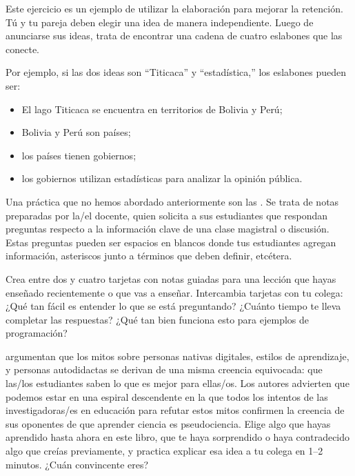 
Este ejercicio es un ejemplo de utilizar la elaboración para mejorar la retención.
Tú y tu pareja deben elegir una idea de manera independiente.
Luego de anunciarse sus ideas,
trata de encontrar una cadena de cuatro eslabones
que las conecte.

Por ejemplo,
si las dos ideas son ``Titicaca'' y ``estadística,''
los eslabones pueden ser:

\begin{itemize}

\item
  El lago Titicaca se encuentra en territorios de Bolivia y Perú;

\item
  Bolivia y Perú son países;

\item
 los países tienen gobiernos;

\item
  los gobiernos utilizan estadísticas para analizar la opinión pública.

\end{itemize}


Una práctica que no hemos abordado anteriormente son las .
Se trata de notas preparadas por la/el docente,
quien solicita a sus estudiantes que respondan preguntas respecto a la información clave de una clase magistral o discusión.
Estas preguntas pueden ser espacios en blancos donde tus estudiantes agregan información,
asteriscos junto a términos que deben definir,
etcétera.

Crea entre dos y cuatro tarjetas con notas guiadas para una lección que hayas enseñado recientemente
o que vas a enseñar.
Intercambia tarjetas con tu colega:
¿Qué tan fácil es entender lo que se está preguntando?
¿Cuánto tiempo te lleva completar las respuestas?
¿Qué tan bien funciona esto para ejemplos de programación?


\cite{Kirs2013} argumentan que los mitos sobre personas nativas digitales,
estilos de aprendizaje,
y personas autodidactas se derivan de una misma creencia equivocada: que
las/los estudiantes saben lo que es mejor para ellas/os.
Los autores advierten que podemos estar en una espiral descendente
en la que todos los intentos de las investigadoras/es en educación para refutar estos mitos
confirmen la creencia de sus oponentes de que aprender ciencia es pseudociencia.
Elige algo que hayas aprendido hasta ahora en este libro,
que te haya sorprendido o haya contradecido algo que creías previamente,
y practica explicar esa idea a tu colega en 1--2 minutos.
¿Cuán convincente eres?

